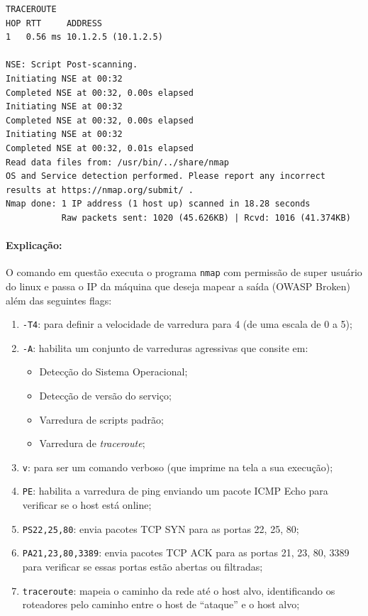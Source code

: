 \documentclass[12pt]{article}
\begin{document}
\begin{lstlisting}
TRACEROUTE
HOP RTT     ADDRESS
1   0.56 ms 10.1.2.5 (10.1.2.5)

NSE: Script Post-scanning.
Initiating NSE at 00:32
Completed NSE at 00:32, 0.00s elapsed
Initiating NSE at 00:32
Completed NSE at 00:32, 0.00s elapsed
Initiating NSE at 00:32
Completed NSE at 00:32, 0.01s elapsed
Read data files from: /usr/bin/../share/nmap
OS and Service detection performed. Please report any incorrect results at https://nmap.org/submit/ .
Nmap done: 1 IP address (1 host up) scanned in 18.28 seconds
           Raw packets sent: 1020 (45.626KB) | Rcvd: 1016 (41.374KB)
\end{lstlisting}

\paragraph{Explicação:}

O comando em questão executa o programa \texttt{nmap} com permissão de super usuário do linux e passa o IP da máquina que deseja mapear a saída (OWASP Broken) além das seguintes flags:

\begin{enumerate}
  \item \texttt{-T4}: para definir a velocidade de varredura para 4 (de uma escala de 0 a 5);
  \item \texttt{-A}: habilita um conjunto de varreduras agressivas que consite em:
  \begin{itemize}
    \item Detecção do Sistema Operacional;
    \item Detecção de versão do serviço;
    \item Varredura de scripts padrão;
    \item Varredura de \textit{traceroute};
  \end{itemize}
  \item \texttt{v}:  para ser um comando verboso (que imprime na tela a sua execução);
  \item \texttt{PE}:  habilita a varredura de ping enviando um pacote ICMP Echo para verificar se o host está online;
  \item \texttt{PS22,25,80}:  envia pacotes TCP SYN para as portas 22, 25, 80;
  \item \texttt{PA21,23,80,3389}:  envia pacotes TCP ACK para as portas 21, 23, 80, 3389 para verificar se essas portas estão abertas ou
  filtradas;
  \item \texttt{traceroute}:  mapeia o caminho da rede até o host alvo, identificando os roteadores pelo caminho entre o host de
  “ataque” e o host alvo; 
\end{enumerate}
\end{document}
